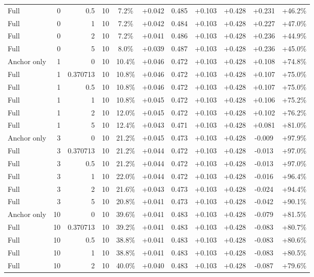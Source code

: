 \begin{table}[htbp]
\begin{tabular}{lrrrccccccc}
Full & 0 & 0.5 & 10 & 7.2\% & +0.042 & 0.485 & +0.103 & +0.428 & +0.231 & +46.2\% \\
Full & 0 & 1 & 10 & 7.2\% & +0.042 & 0.484 & +0.103 & +0.428 & +0.227 & +47.0\% \\
Full & 0 & 2 & 10 & 7.2\% & +0.041 & 0.486 & +0.103 & +0.428 & +0.236 & +44.9\% \\
Full & 0 & 5 & 10 & 8.0\% & +0.039 & 0.487 & +0.103 & +0.428 & +0.236 & +45.0\% \\
Anchor only & 1 & 0 & 10 & 10.4\% & +0.046 & 0.472 & +0.103 & +0.428 & +0.108 & +74.8\% \\
Full & 1 & 0.370713 & 10 & 10.8\% & +0.046 & 0.472 & +0.103 & +0.428 & +0.107 & +75.0\% \\
Full & 1 & 0.5 & 10 & 10.8\% & +0.046 & 0.472 & +0.103 & +0.428 & +0.107 & +75.0\% \\
Full & 1 & 1 & 10 & 10.8\% & +0.045 & 0.472 & +0.103 & +0.428 & +0.106 & +75.2\% \\
Full & 1 & 2 & 10 & 12.0\% & +0.045 & 0.472 & +0.103 & +0.428 & +0.102 & +76.2\% \\
Full & 1 & 5 & 10 & 12.4\% & +0.043 & 0.471 & +0.103 & +0.428 & +0.081 & +81.0\% \\
Anchor only & 3 & 0 & 10 & 21.2\% & +0.045 & 0.473 & +0.103 & +0.428 & -0.009 & +97.9\% \\
Full & 3 & 0.370713 & 10 & 21.2\% & +0.044 & 0.472 & +0.103 & +0.428 & -0.013 & +97.0\% \\
Full & 3 & 0.5 & 10 & 21.2\% & +0.044 & 0.472 & +0.103 & +0.428 & -0.013 & +97.0\% \\
Full & 3 & 1 & 10 & 22.0\% & +0.044 & 0.472 & +0.103 & +0.428 & -0.016 & +96.4\% \\
Full & 3 & 2 & 10 & 21.6\% & +0.043 & 0.473 & +0.103 & +0.428 & -0.024 & +94.4\% \\
Full & 3 & 5 & 10 & 20.8\% & +0.041 & 0.473 & +0.103 & +0.428 & -0.042 & +90.1\% \\
Anchor only & 10 & 0 & 10 & 39.6\% & +0.041 & 0.483 & +0.103 & +0.428 & -0.079 & +81.5\% \\
Full & 10 & 0.370713 & 10 & 39.2\% & +0.041 & 0.483 & +0.103 & +0.428 & -0.083 & +80.7\% \\
Full & 10 & 0.5 & 10 & 38.8\% & +0.041 & 0.483 & +0.103 & +0.428 & -0.083 & +80.6\% \\
Full & 10 & 1 & 10 & 38.8\% & +0.041 & 0.483 & +0.103 & +0.428 & -0.083 & +80.5\% \\
Full & 10 & 2 & 10 & 40.0\% & +0.040 & 0.483 & +0.103 & +0.428 & -0.087 & +79.6\% \\

\end{tabular}
\end{table}
